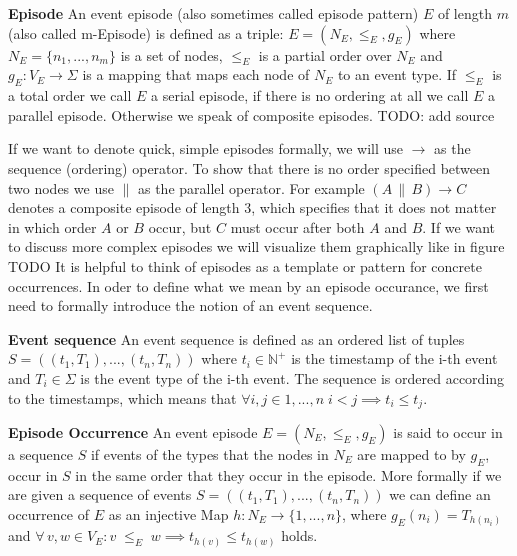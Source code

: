 \begin{mydef}
\textbf{Episode} An event episode (also sometimes called episode pattern) $E$ of length $m$ (also called m-Episode) is defined as a triple: $E = (N_E,{\leq}_{E},g_E)$ where $N_E = \{n_1,...,n_m\}$ is a set of nodes, ${\leq}_{E}$ is a partial order over $N_E$ and $g_E : V_E \rightarrow \Sigma$ is a mapping that maps each node of $N_E$ to an event type. If ${\leq}_{E}$ is a total order we call $E$ a serial episode, if there is no ordering at all we call $E$ a parallel episode. Otherwise we speak of composite episodes. TODO: add source
\end{mydef}

If we want to denote quick, simple episodes formally, we will use $\rightarrow$ as the sequence (ordering) operator. To show that there is no order specified between two nodes we use $\|$ as the parallel operator. For example $(A \, \| \, B ) \rightarrow C$ denotes a composite episode of length 3, which specifies that it does not matter in which order $A$ or $B$ occur, but $C$ must occur after both $A$ and $B$. If we want to discuss more complex episodes we will visualize them graphically like in figure TODO \newline  
It is helpful to think of episodes as a template or pattern for concrete occurrences. In oder to define what we mean by an episode occurance, we first need to formally introduce the notion of an event sequence.

\begin{mydef}
\textbf{Event sequence} An event sequence is defined as an ordered list of tuples $S = ( (t_1,T_1),..., (t_n,T_n) ) $ where $t_i \in \mathbb{N}^+$ is the timestamp of the i-th event and $T_i \in \Sigma$ is the event type of the i-th event. The sequence is ordered according to the timestamps, which means that $\forall i,j \in {1,...,n} \; i<j \implies t_i \leq t_j$. 
\end{mydef}

\begin{mydef}
\textbf{Episode Occurrence} An event episode $E = (N_E,{\leq}_{E},g_E)$ is said to occur in a sequence $S$ if events of the types that the nodes in $N_E$ are mapped to by $g_E$, occur in $S$ in the same order that they occur in the episode. More formally if we are given a sequence of events $S=((t_1,T_1),...,(t_n,T_n))$ we can define an occurrence of $E$ as an injective Map $h:N_E \rightarrow \{1,...,n\}$, where $g_E(n_i) = T_{h(n_i)}$ and $\forall \, v,w \in V_E : v \;{\leq}_{E}\; w \implies t_{h(v)} \le t_{h(w)}$ holds.
\end{mydef}

